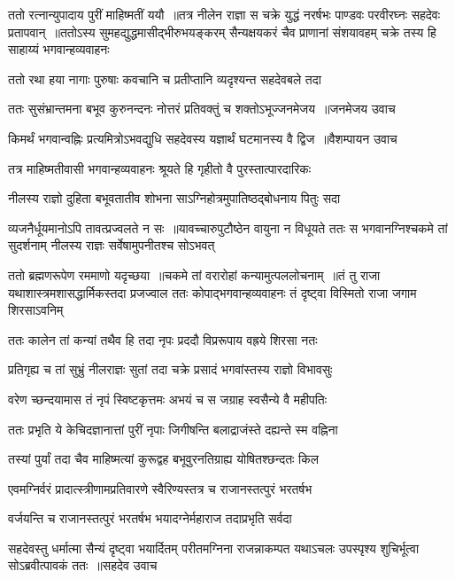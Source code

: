 ततो रत्नान्युपादाय पुरीं माहिष्मतीं ययौ ॥तत्र नीलेन राज्ञा स चक्रे युद्धं नरर्षभः
पाण्डवः परवीरघ्नः सहदेवः प्रतापवान् ॥ततोऽस्य सुमहद्युद्धमासीद्भीरुभयङ्करम्
\twolineshloka
{सैन्यक्षयकरं चैव प्राणानां संशयावहम्}
{चक्रे तस्य हि साहाय्यं भगवान्हव्यवाहनः}


\twolineshloka
{ततो रथा हया नागाः पुरुषाः कवचानि च}
{प्रतीप्तानि व्यदृश्यन्त सहदेवबले तदा}


\threelineshloka
{ततः सुसंभ्रान्तमना बभूव कुरुनन्दनः}
{नोत्तरं प्रतिवक्तुं च शक्तोऽभूज्जनमेजय ॥जनमेजय उवाच}
{}


\threelineshloka
{किमर्थं भगवान्वह्निः प्रत्यमित्रोऽभवद्युधि}
{सहदेवस्य यज्ञार्थं घटमानस्य वै द्विज ॥वैशम्पायन उवाच}
{}


\twolineshloka
{तत्र माहिष्मतीवासी भगवान्हव्यवाहनः}
{श्रूयते हि गृहीतो वै पुरस्तात्पारदारिकः}


\twolineshloka
{नीलस्य राज्ञो दुहिता बभूवतातीव शोभना}
{साऽग्निहोत्रमुपातिष्ठद्बोधनाय पितुः सदा}


व्यजनैर्धूयमानोऽपि तावत्प्रज्वलते न सः ॥यावच्चारुपुटौष्ठेन वायुना न विधूयते
\twolineshloka
{ततः स भगवानग्निश्चकमे तां सुदर्शनाम्}
{नीलस्य राज्ञः सर्वेषामुपनीतश्च सोऽभवत्}


ततो ब्रह्मणरूपेण रममाणो यदृच्छया ॥चकमे तां वरारोहां कन्यामुत्पललोचनाम् ॥तं तु राजा यथाशास्त्रमशासद्धार्मिकस्तदा
\twolineshloka
{प्रजज्वाल ततः कोपाद्भगवान्हव्यवाहनः}
{तं दृष्ट्वा विस्मितो राजा जगाम शिरसाऽवनिम्}


\twolineshloka
{ततः कालेन तां कन्यां तथैव हि तदा नृपः}
{प्रददौ विप्ररूपाय वह्रये शिरसा नतः}


\twolineshloka
{प्रतिगृह्य च तां सुभ्रुं नीलराज्ञः सुतां तदा}
{चक्रे प्रसादं भगवांस्तस्य राज्ञो विभावसुः}


\twolineshloka
{वरेण च्छन्दयामास तं नृपं स्विष्टकृत्तमः}
{अभयं च स जग्राह स्वसैन्ये वै महीपतिः}


\twolineshloka
{ततः प्रभृति ये केचिदज्ञानात्तां पुरीं नृपाः}
{जिगीषन्ति बलाद्राजंस्ते दह्यन्ते स्म वह्निना}


\twolineshloka
{तस्यां पुर्यां तदा चैव माहिष्मत्यां कुरूद्वह}
{बभूवुरनतिग्राह्य योषितश्छन्दतः किल}


\threelineshloka
{एवमग्निर्वरं प्रादात्स्त्रीणामप्रतिवारणे}
{स्वैरिण्यस्तत्र च राजानस्तत्पुरं भरतर्षभ}
{}


\twolineshloka
{वर्जयन्ति च राजानस्तत्पुरं भरतर्षभ}
{भयादग्नेर्महाराज तदाप्रभृति सर्वदा}


\fourlineindentedshloka
{सहदेवस्तु धर्मात्मा सैन्यं दृष्ट्वा भयार्दितम्}
{परीतमग्निना राजन्नाकम्पत यथाऽचलः}
{उपस्पृश्य शुचिर्भूत्वा सोऽब्रवीत्पावकं ततः ॥सहदेव उवाच}
{}


